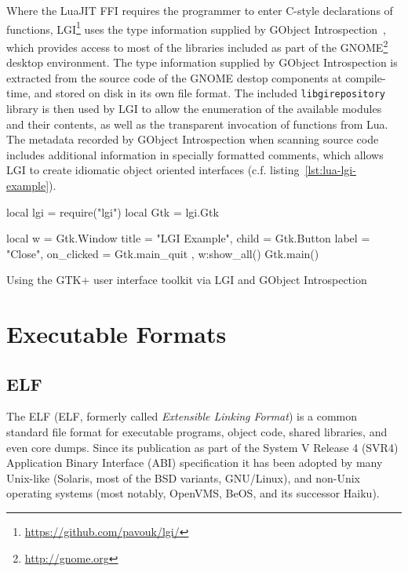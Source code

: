 Where the LuaJIT FFI requires the programmer to enter C-style declarations of
functions, LGI\footnote{\url{https://github.com/pavouk/lgi/}} uses the type
information supplied by GObject Introspection~\cite{gobject-introspection},
which provides access to most of the libraries included as part of the
GNOME\footnote{\url{http://gnome.org}} desktop environment. The type
information supplied by GObject Introspection is extracted from the source
code of the GNOME destop components at compile-time, and stored on disk in its
own file format. The included \verb|libgirepository| library is then used by
LGI to allow the enumeration of the available modules and their contents, as
well as the transparent invocation of functions from Lua. The metadata
recorded by GObject Introspection when scanning source code includes
additional information in specially formatted comments, which allows LGI to
create idiomatic object oriented interfaces (c.f.
listing~\autoref{lst:lua-lgi-example}).

\begin{listing}[H]
	\begin{luacode}
	local lgi = require("lgi")
	local Gtk = lgi.Gtk

	local w = Gtk.Window {
		title = "LGI Example",
		child = Gtk.Button { label = "Close",
                         on_clicked = Gtk.main_quit },
	}
	w:show_all()
	Gtk.main()
	\end{luacode}
	\caption{Using the GTK+ user interface toolkit via LGI and GObject
	Introspection}
	\label{lst:lua-lgi-example}
\end{listing}

\section{Executable Formats}

\subsection{ELF}
  \label{sec:elf}

The \acrlong{ELF} (ELF, formerly called \emph{Extensible Linking
Format}) is a common standard file format for executable programs, object
code, shared libraries, and even core dumps. Since its publication as part of
the System V Release 4 (SVR4) Application Binary Interface (ABI) specification
\cite[c.~4]{elfspec-sysv}
it has been adopted by many Unix-like (Solaris, most of the BSD variants,
GNU/Linux), and non-Unix operating systems (most notably, OpenVMS, BeOS, and
its successor Haiku).

